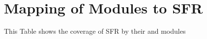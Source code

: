 \chapter{Mapping of  Modules to SFR}\label{appendix.sfr2module}

This Table shows the coverage of SFR by their  and  modules

\generateSfrToModulesTable{}


